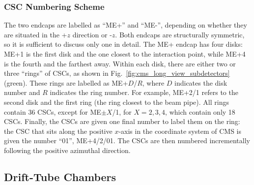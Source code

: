 \subsubsection{CSC Numbering Scheme}
\label{subsubsec:csc_numbering}
The two endcaps are labelled as ``ME+'' and ``ME-'', depending on whether they are situated in the +$z$ direction or -$z$.
Both endcaps are structurally symmetric, so it is sufficient to discuss only one in detail.
The ME+ endcap has four disks: ME+1 is the first disk and the one closest to the interaction point, while ME+4 is the fourth and the farthest away. 
Within each disk, there are either two or three ``rings'' of CSCs, as shown in Fig.~\ref{fig:cms_long_view_subdetectors} (green).
These rings are labelled as ME+$D$/$R$, where $D$ indicates the disk number and $R$ indicates the ring number.
For example, ME+2/1 refers to the second disk and the first ring (the ring closest to the beam pipe).
All rings contain 36 CSCs, except for ME$\pm X$/1, for $X= 2,3,4$, which contain only 18 CSCs.
Finally, the CSCs are given one final number to label them on the ring:
the CSC that sits along the positive $x$-axis in the coordinate system of CMS is given the number ``01'', \eg ME+4/2/01. 
The CSCs are then numbered incrementally following the positive azimuthal direction.

\subsection{Drift-Tube Chambers}
\label{subsec:dt}

